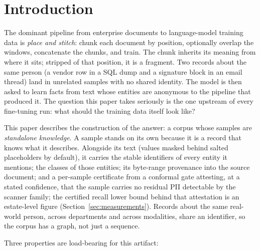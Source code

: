 \documentclass{article}
\begin{document}
\section{Introduction}
\label{sec:intro}

The dominant pipeline from enterprise documents to language-model training data is \emph{place and stitch}: chunk each document by position, optionally overlap the windows, concatenate the chunks, and train. The chunk inherits its meaning from where it sits; stripped of that position, it is a fragment. Two records about the same person (a vendor row in a SQL dump and a signature block in an email thread) land in unrelated samples with no shared identity. The model is then asked to learn facts from text whose entities are anonymous to the pipeline that produced it. The question this paper takes seriously is the one upstream of every fine-tuning run: what should the training data itself look like?

This paper describes the construction of the answer: a corpus whose samples are \emph{standalone knowledge}. A sample stands on its own because it is a record that knows what it describes. Alongside its text (values masked behind salted placeholders by default), it carries the stable identifiers of every entity it mentions; the classes of those entities; its byte-range provenance into the source document; and a per-sample certificate from a conformal gate attesting, at a stated confidence, that the sample carries no residual PII detectable by the scanner family; the certified recall lower bound behind that attestation is an estate-level figure (Section~\ref{sec:measurements}). Records about the same real-world person, across departments and across modalities, share an identifier, so the corpus has a graph, not just a sequence.

Three properties are load-bearing for this artifact:
\end{document}

